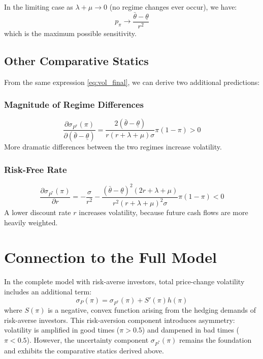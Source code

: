 \documentclass[12pt]{article}
\begin{document}
In the limiting case as $\lambda + \mu \to 0$ (no regime changes ever occur), we have:
\begin{equation}
p_\pi \to \frac{\bar{\theta} - \underline{\theta}}{r^2}
\end{equation}
which is the maximum possible sensitivity.

\subsection{Other Comparative Statics}

From the same expression \eqref{eq:vol_final}, we can derive two additional predictions:

\subsubsection{Magnitude of Regime Differences}
\begin{equation}
\frac{\partial \sigma_{P^*}(\pi)}{\partial (\bar{\theta} - \underline{\theta})} = \frac{2(\bar{\theta} - \underline{\theta})}{r(r + \lambda + \mu)\sigma} \pi(1-\pi) > 0
\end{equation}
More dramatic differences between the two regimes increase volatility.

\subsubsection{Risk-Free Rate}
\begin{equation}
\frac{\partial \sigma_{P^*}(\pi)}{\partial r} = -\frac{\sigma}{r^2} - \frac{(\bar{\theta} - \underline{\theta})^2 (2r + \lambda + \mu)}{r^2(r + \lambda + \mu)^2\sigma} \pi(1-\pi) < 0
\end{equation}
A lower discount rate $r$ increases volatility, because future cash flows are more heavily weighted.

\section{Connection to the Full Model}

In the complete model with risk-averse investors, total price-change volatility includes an additional term:
\begin{equation}
\sigma_P(\pi) = \sigma_{P^*}(\pi) + S'(\pi)h(\pi)
\end{equation}
where $S(\pi)$ is a negative, convex function arising from the hedging demands of risk-averse investors. This risk-aversion component introduces asymmetry: volatility is amplified in good times ($\pi > 0.5$) and dampened in bad times ($\pi < 0.5$). However, the uncertainty component $\sigma_{P^*}(\pi)$ remains the foundation and exhibits the comparative statics derived above.
\end{document}
